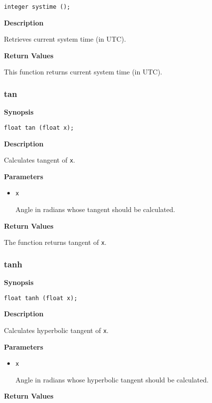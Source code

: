 \documentclass[a4paper, 10pt, titlepage]{article}
\begin{document}
\begin{verbatim}
integer systime ();
\end{verbatim}

\textbf{Description}

Retrieves current system time (in UTC).

\textbf{Return Values}

This function returns current system time (in UTC).

\subsubsection{tan}

\textbf{Synopsis}

\begin{verbatim}
float tan (float x);
\end{verbatim}

\textbf{Description}

Calculates tangent of \texttt{x}.

\textbf{Parameters}

\begin{itemize}
\item \texttt{x}

Angle in radians whose tangent should be calculated.
\end{itemize}

\textbf{Return Values}

The function returns tangent of \texttt{x}.

\subsubsection{tanh}

\textbf{Synopsis}

\begin{verbatim}
float tanh (float x);
\end{verbatim}

\textbf{Description}

Calculates hyperbolic tangent of \texttt{x}.

\textbf{Parameters}

\begin{itemize}
\item \texttt{x}

Angle in radians whose hyperbolic tangent should be calculated.
\end{itemize}

\textbf{Return Values}
\end{document}
